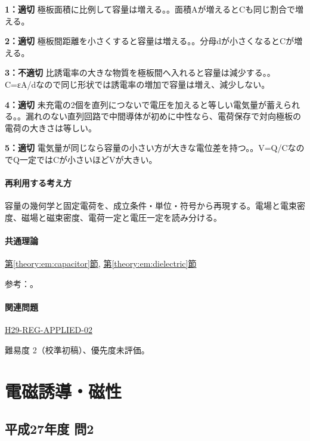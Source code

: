 \noindent\textbf{1：適切} 極板面積に比例して容量は増える。。面積Aが増えるとCも同じ割合で増える。\par

\noindent\textbf{2：適切} 極板間距離を小さくすると容量は増える。。分母dが小さくなるとCが増える。\par

\noindent\textbf{3：不適切} 比誘電率の大きな物質を極板間へ入れると容量は減少する。。C=εA/dなので同じ形状では誘電率の増加で容量は増え、減少しない。\par

\noindent\textbf{4：適切} 未充電の2個を直列につないで電圧を加えると等しい電気量が蓄えられる。。漏れのない直列回路で中間導体が初めに中性なら、電荷保存で対向極板の電荷の大きさは等しい。\par

\noindent\textbf{5：適切} 電気量が同じなら容量の小さい方が大きな電位差を持つ。。V=\allowbreak{}Q/CなのでQ一定ではCが小さいほどVが大きい。\par

\paragraph{再利用する考え方} 容量の幾何学と固定電荷を、成立条件・単位・符号から再現する。電場と電束密度、磁場と磁束密度、電荷一定と電圧一定を読み分ける。

\paragraph{共通理論} \hyperref[theory:em:capacitor]{第\ref*{theory:em:capacitor}節}, \hyperref[theory:em:dielectric]{第\ref*{theory:em:dielectric}節}

\par 参考：\cite{mit_em05}。

\paragraph{関連問題} \hyperref[q:h29-reg-applied-02]{H29-REG-APPLIED-02}

\par 難易度 2（校準初稿）、優先度未評価。

\section{電磁誘導・磁性}

\subsection{平成27年度 問2}
\label{q:h27-reg-applied-02}

